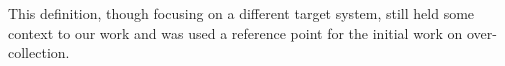 This definition, though focusing on a different target system, still held some context to our work and was used a reference point for the initial work on over-collection.









